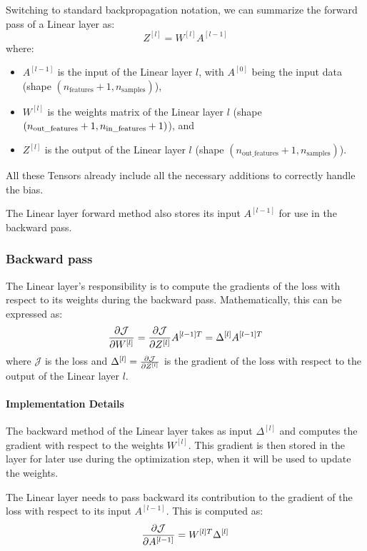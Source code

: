 Switching to standard backpropagation notation, we can summarize the forward pass of a Linear layer as:
\begin{equation}
    Z^{[l]} = W^{[l]} A^{[l - 1]}
\end{equation}
where:
\begin{itemize}
    \item $A^{[l - 1]}$ is the input of the Linear layer $l$, with $A^{[0]}$ being the input data (shape $(n_{\text{features}} + 1, n_{\text{samples}})$),
    \item $W^{[l]}$ is the weights matrix of the Linear layer $l$ (shape $(n_{\text{out\_features}} + 1,\\ n_{\text{in\_features}} + 1)$), and
    \item $Z^{[l]}$ is the output of the Linear layer $l$ (shape $(n_{\text{out\_features}} + 1, n_{\text{samples}})$).
\end{itemize}
All these Tensors already include all the necessary additions to correctly handle the bias.

The Linear layer forward method also stores its input $A^{[l - 1]}$ for use in the backward pass.

\subsubsection{Backward pass}
The Linear layer's responsibility is to compute the gradients of the loss with respect to its weights during the backward pass. Mathematically, this can be expressed as:
\begin{equation}
    \pdv{\mathcal{J}}{W^{[l]}} = \pdv{\mathcal{J}}{Z^{[l]}} A^{[l - 1]T} = \Delta^{[l]} A^{[l - 1]T}
\end{equation}
where $\mathcal{J}$ is the loss and $\Delta^{[l]} = \pdv{\mathcal{J}}{Z^{[l]}}$ is the gradient of the loss with respect to the output of the Linear layer $l$.

\paragraph{Implementation Details} The backward method of the Linear layer takes as input $\Delta^{[l]}$ and computes the gradient with respect to the weights $W^{[l]}$. This gradient is then stored in the layer for later use during the optimization step, when it will be used to update the weights.

The Linear layer needs to pass backward its contribution to the gradient of the loss with respect to its input $A^{[l - 1]}$. This is computed as:
\begin{equation}
    \pdv{\mathcal{J}}{A^{[l - 1]}} = W^{[l]T} \Delta^{[l]}
\end{equation}

